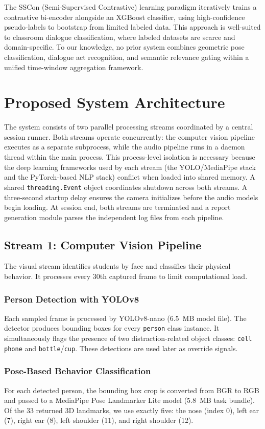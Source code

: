 \documentclass[conference]{IEEEtran}
\begin{document}
The SSCon (Semi-Supervised Contrastive) learning paradigm \cite{b4} iteratively trains a contrastive bi-encoder alongside an XGBoost classifier, using high-confidence pseudo-labels to bootstrap from limited labeled data. This approach is well-suited to classroom dialogue classification, where labeled datasets are scarce and domain-specific. To our knowledge, no prior system combines geometric pose classification, dialogue act recognition, and semantic relevance gating within a unified time-window aggregation framework.

\section{Proposed System Architecture}
The system consists of two parallel processing streams coordinated by a central session runner. Both streams operate concurrently: the computer vision pipeline executes as a separate subprocess, while the audio pipeline runs in a daemon thread within the main process. This process-level isolation is necessary because the deep learning frameworks used by each stream (the YOLO/MediaPipe stack and the PyTorch-based NLP stack) conflict when loaded into shared memory. A shared \texttt{threading.Event} object coordinates shutdown across both streams. A three-second startup delay ensures the camera initializes before the audio models begin loading. At session end, both streams are terminated and a report generation module parses the independent log files from each pipeline.

\subsection{Stream 1: Computer Vision Pipeline}
The visual stream identifies students by face and classifies their physical behavior. It processes every 30th captured frame to limit computational load.

\subsubsection{Person Detection with YOLOv8}
Each sampled frame is processed by YOLOv8-nano \cite{b1} (6.5~MB model file). The detector produces bounding boxes for every \texttt{person} class instance. It simultaneously flags the presence of two distraction-related object classes: \texttt{cell phone} and \texttt{bottle}/\texttt{cup}. These detections are used later as override signals.

\subsubsection{Pose-Based Behavior Classification}
For each detected person, the bounding box crop is converted from BGR to RGB and passed to a MediaPipe Pose Landmarker Lite model \cite{b2} (5.8~MB task bundle). Of the 33 returned 3D landmarks, we use exactly five: the nose (index 0), left ear (7), right ear (8), left shoulder (11), and right shoulder (12).
\end{document}
